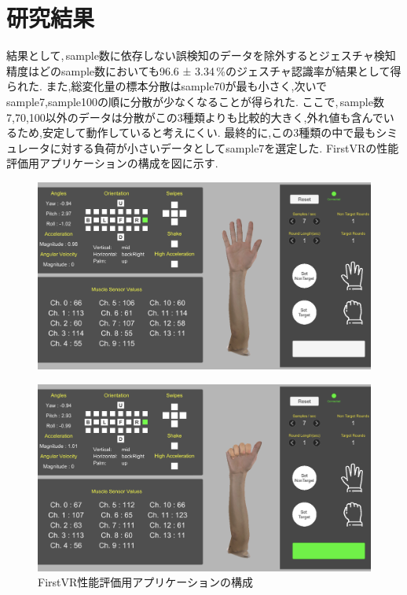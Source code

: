 \documentclass{ltjsarticle}
\begin{document}
\section{研究結果}
		結果として,\,sample数に依存しない誤検知のデータを除外するとジェスチャ検知精度はどのsample数においても96.6 ± 3.34\,\%のジェスチャ認識率が結果として得られた.
		また,総変化量の標本分散はsample70が最も小さく,次いでsample7,sample100の順に分散が少なくなることが得られた.
		ここで,\,sample数7,70,100以外のデータは分散がこの3種類よりも比較的大きく,外れ値も含んでいるため,安定して動作していると考えにくい.
		最終的に,この3種類の中で最もシミュレータに対する負荷が小さいデータとしてsample7を選定した.
		FirstVRの性能評価用アプリケーションの構成を図に示す.
		\begin{figure}[H]
		\centering
		\begin{minipage}{0.9\columnwidth}
		\centering
		\includegraphics[width = \columnwidth]{../figs/IMG_1866.PNG}
		\label{fig:FVRnocalibration}
		\end{minipage}
		\hspace{0.04\columnwidth}
		\begin{minipage}{0.9\columnwidth}
		\centering
		\includegraphics[width = \columnwidth]{../figs/IMG_1867.PNG}
		\end{minipage}
		\caption{FirstVR性能評価用アプリケーションの構成}
		\label{fig:FirstVRapplication}
		\end{figure}
		\vspace{-15pt}
\end{document}
